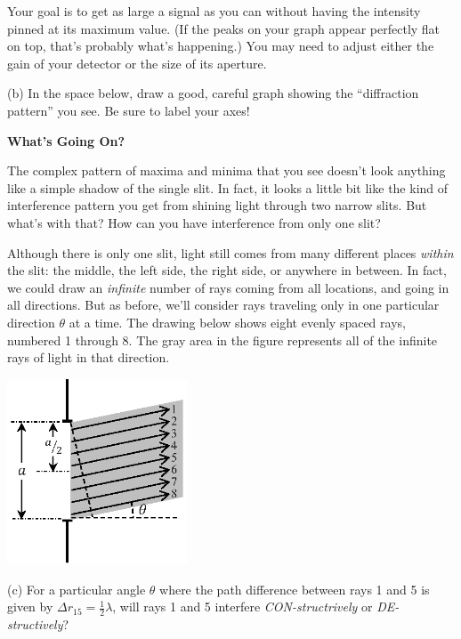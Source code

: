 Your goal is to get as large a signal as you can without having the intensity pinned at its maximum value.  (If the peaks on your graph appear perfectly flat on top, that's probably what's happening.) You may need to adjust either the gain of your detector or the size of its aperture.

(b) In the space below, draw a good, careful graph showing the ``diffraction pattern'' you see.  
Be sure to label your axes!
\answerspace{1.5in}

\pagebreak[2]
\textbf{What's Going On?}

The complex pattern of maxima and minima that you see doesn't look anything like a simple shadow of the single slit.  In fact, it looks a little bit like the kind of interference pattern you get from shining light through two narrow slits.  But what's with that?  How can you have interference from only one slit?

Although there is only one slit, light still comes from many different places \textit{within} the slit: the middle, the left side, the right side, or anywhere in between.  In fact, we could draw an \textit{infinite} number of rays coming from all locations, and going in all directions.  But as before, we'll consider rays traveling only in one particular direction $\theta$ at a time.  The drawing below shows eight evenly spaced rays, numbered 1 through 8.  The gray area in the figure represents all of the infinite rays of light in that direction.

\answerspace{0.2in}
\begin{center}
\includegraphics[width=0.4\textwidth]{diffraction_of_light/one_slit.eps}
\end{center}
\answerspace{0.2in}

(c) For a particular angle $\theta$ where the path difference between rays 1 and 5 is given by $\Delta r_{15}=\frac{1}{2}\lambda$, will rays 1 and 5 interfere \textit{CON-structrively} or \textit{DE-structively}?
\answerspace{0.4in}

